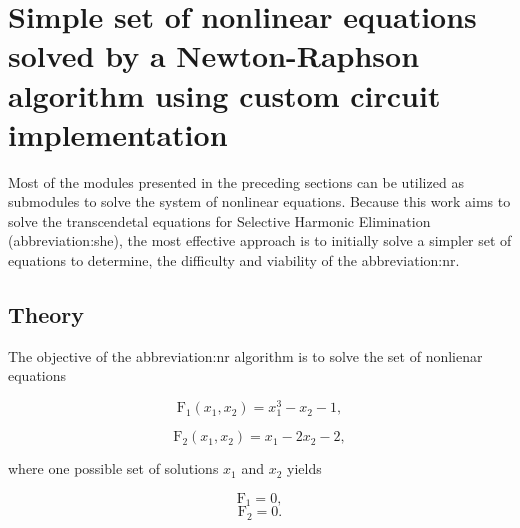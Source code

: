 \documentclass[a4paper, twoside, 11pt]{article}
\begin{document}
\section{Simple set of nonlinear equations solved by a Newton-Raphson algorithm using custom circuit implementation}\label{sec:simple-set-of-nonlinear-equations-solved-by-a-newton-raphson-algorithm-using-custom-circuit-implementation}
    Most of the modules presented in the preceding sections can be utilized as submodules to solve the system of nonlinear equations. Because this work aims to solve the transcendetal equations for Selective Harmonic Elimination (\gls{abbreviation:she}), the most effective approach is to initially solve a simpler set of equations to determine, the difficulty and viability of the \gls{abbreviation:nr}.
    \subsection{Theory}
        The objective of the \gls{abbreviation:nr} algorithm is to solve the set of nonlienar equations


        \begin{equation}
            \text{F}_1 (x_1, x_2) = x_1^3 - x_2 - 1, 
        \end{equation}

        \begin{equation}
            \text{F}_2 (x_1, x_2) = x_1 - 2 x_2 - 2, 
        \end{equation}

        where one possible set of solutions $x_1$ and $x_2$ yields

        \begin{equation}
            \text{F}_1 = 0, 
        \end{equation}
        \begin{equation}
            \text{F}_2 = 0.
        \end{equation}
\end{document}
